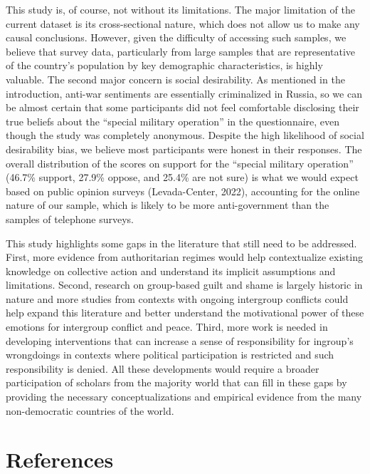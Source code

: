 \documentclass[
]{article}
\begin{document}
This study is, of course, not without its limitations. The major limitation of the current dataset is its cross-sectional nature, which does not allow us to make any causal conclusions. However, given the difficulty of accessing such samples, we believe that survey data, particularly from large samples that are representative of the country's population by key demographic characteristics, is highly valuable. The second major concern is social desirability. As mentioned in the introduction, anti-war sentiments are essentially criminalized in Russia, so we can be almost certain that some participants did not feel comfortable disclosing their true beliefs about the ``special military operation'' in the questionnaire, even though the study was completely anonymous. Despite the high likelihood of social desirability bias, we believe most participants were honest in their responses. The overall distribution of the scores on support for the ``special military operation'' (46.7\% support, 27.9\% oppose, and 25.4\% are not sure) is what we would expect based on public opinion surveys (Levada-Center, 2022), accounting for the online nature of our sample, which is likely to be more anti-government than the samples of telephone surveys.

This study highlights some gaps in the literature that still need to be addressed. First, more evidence from authoritarian regimes would help contextualize existing knowledge on collective action and understand its implicit assumptions and limitations. Second, research on group-based guilt and shame is largely historic in nature and more studies from contexts with ongoing intergroup conflicts could help expand this literature and better understand the motivational power of these emotions for intergroup conflict and peace. Third, more work is needed in developing interventions that can increase a sense of responsibility for ingroup's wrongdoings in contexts where political participation is restricted and such responsibility is denied. All these developments would require a broader participation of scholars from the majority world that can fill in these gaps by providing the necessary conceptualizations and empirical evidence from the many non-democratic countries of the world.

\hypertarget{references}{%
\section*{References}\label{references}}
\end{document}
